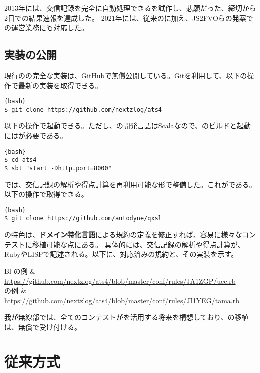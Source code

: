 \documentclass[10pt,a4paper]{book}
\begin{document}
2013年には、交信記録を完全に自動処理できるを試作し、悲願だった、締切から2日での結果速報を達成した。
2021年には、従来の\ja{}に加え、JS2FVOらの発案で\rt{}の運営業務にも対応した。

\section{実装の公開}

現行のの完全な実装は、GitHubで無償公開している。Gitを利用して、以下の操作で最新の実装を取得できる。

\begin{Verbatim}{bash}
$ git clone https://github.com/nextzlog/ats4
\end{Verbatim}

以下の操作で起動できる。ただし、の開発言語はScalaなので、のビルドと起動には\sbt{}が必要である。

\begin{Verbatim}{bash}
$ cd ats4
$ sbt "start -Dhttp.port=8000"
\end{Verbatim}

では、交信記録の解析や得点計算を再利用可能な形で整備した。これが\qxsl{}である。以下の操作で取得できる。

\begin{Verbatim}{bash}
$ git clone https://github.com/autodyne/qxsl
\end{Verbatim}

の特色は、\textbf{ドメイン特化言語}による規約の定義を修正すれば、容易に様々なコンテストに移植可能な点にある。
具体的には、交信記録の解析や得点計算が、RubyやLISPで記述される。以下に、対応済みの規約と、その実装を示す。

\begin{table}[H]
\raggedright
\begin{tabular}{Bl}
\ue{}の例 & \url{https://github.com/nextzlog/ats4/blob/master/conf/rules/JA1ZGP/uec.rb} \\
\ta{}の例 & \url{https://github.com/nextzlog/ats4/blob/master/conf/rules/JI1YEG/tama.rb} \\
\end{tabular}
\end{table}

我が無線部では、全てのコンテストがを活用する将来を構想しており、の移植は、無償で受け付ける。

\chapter{従来方式\label{chap:mail}}
\end{document}
